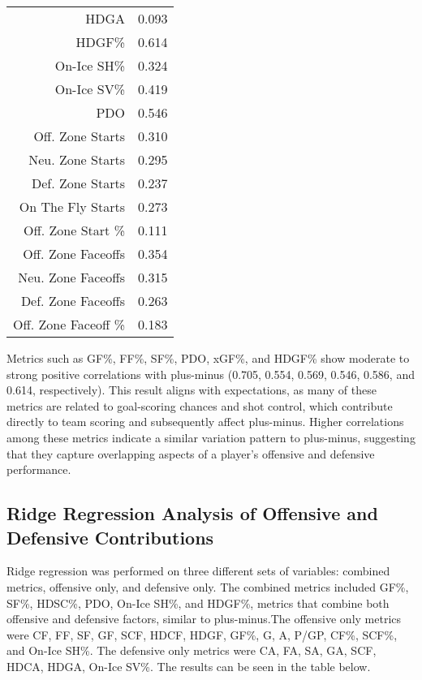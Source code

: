 \documentclass[12pt]{article}
\begin{document}
\begin{table}[tbp]
\begin{tabular}{rr}
  HDGA & 0.093 \\ 
  HDGF\% & 0.614 \\ 
  On-Ice SH\% & 0.324 \\ 
  On-Ice SV\% & 0.419 \\ 
  PDO & 0.546 \\ 
  Off. Zone Starts & 0.310 \\ 
  Neu. Zone Starts & 0.295 \\ 
  Def. Zone Starts & 0.237 \\ 
  On The Fly Starts & 0.273 \\ 
  Off. Zone Start \% & 0.111 \\ 
  Off. Zone Faceoffs & 0.354 \\ 
  Neu. Zone Faceoffs & 0.315 \\ 
  Def. Zone Faceoffs & 0.263 \\ 
  Off. Zone Faceoff \% & 0.183 \\ 
  \bottomrule
\end{tabular}
\end{table}


Metrics such as GF\%, FF\%, SF\%, PDO, xGF\%, and HDGF\% show moderate to strong positive correlations with plus-minus (0.705, 0.554, 
0.569, 0.546, 0.586, and 0.614, respectively). This result aligns with expectations, as many of these metrics are related to goal-scoring 
chances and shot control, which contribute directly to team scoring and subsequently affect plus-minus. Higher correlations among these 
metrics indicate a similar variation pattern to plus-minus, suggesting that they capture overlapping aspects of a player's offensive and 
defensive performance.

\subsection{Ridge Regression Analysis of Offensive and Defensive Contributions}

Ridge regression was performed on three different sets of variables: combined metrics, offensive only, and defensive only. The combined 
metrics included GF\%, SF\%, HDSC\%, PDO, On-Ice SH\%, and HDGF\%, metrics that combine both offensive and defensive factors, similar to 
plus-minus.The offensive only metrics were CF, FF, SF, GF, SCF, HDCF, HDGF, GF\%, G, A, P/GP, CF\%, SCF\%, and On-Ice SH\%. The defensive 
only metrics were CA, FA, SA, GA, SCF, HDCA, HDGA, On-Ice SV\%. The results can be seen in the table below.
\end{document}
